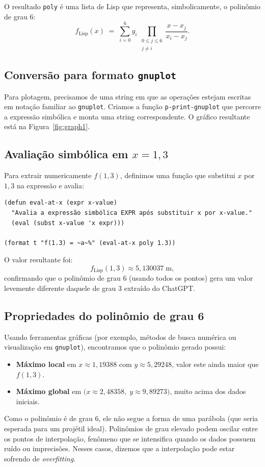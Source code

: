 \documentclass{article}
\begin{document}
O resultado \texttt{poly} é uma lista de Lisp que representa, simbolicamente, o polinômio de grau 6:
\[
f_{\mathrm{Lisp}}(x) \;=\; \sum_{i=0}^{6} y_i \,\prod_{\substack{0 \leq j \leq 6 \\ j \neq i}} \frac{x - x_j}{x_i - x_j}.
\]

\subsection{Conversão para formato \texttt{gnuplot}}
Para plotagem, precisamos de uma string em que as operações estejam escritas em notação familiar ao \texttt{gnuplot}. Criamos a função \texttt{p-print-gnuplot} que percorre a expressão simbólica e monta uma string correspondente. O gráfico resultante está na Figura~\ref{fig:graph1}.

\subsection{Avaliação simbólica em $x = 1{,}3$}
Para extrair numericamente $f(1{,}3)$, definimos uma função que substitui $x$ por $1{,}3$ na expressão e avalia:
\begin{verbatim}
(defun eval-at-x (expr x-value)
  "Avalia a expressão simbólica EXPR após substituir x por x-value."
  (eval (subst x-value 'x expr)))

(format t "f(1.3) = ~a~%" (eval-at-x poly 1.3))
\end{verbatim}

O valor resultante foi:
\[
f_{\mathrm{Lisp}}(1{,}3) \approx 5{,}130037\;\text{m},
\]
confirmando que o polinômio de grau 6 (usando todos os pontos) gera um valor levemente diferente daquele de grau 3 extraído do ChatGPT.

\subsection{Propriedades do polinômio de grau 6}
Usando ferramentas gráficas (por exemplo, métodos de busca numérica ou visualização em \texttt{gnuplot}), encontramos que o polinômio gerado possui:
\begin{itemize}
    \item \textbf{Máximo local} em $x \approx 1{,}19388$ com $y \approx 5{,}29248$, valor este ainda maior que $f(1{,}3)$.
    \item \textbf{Máximo global} em $\bigl(x \approx 2{,}48358,\;y \approx 9{,}89273\bigr)$, muito acima dos dados iniciais. 
\end{itemize}
Como o polinômio é de grau 6, ele não segue a forma de uma parábola (que seria esperada para um projétil ideal). Polinômios de grau elevado podem oscilar entre os pontos de interpolação, fenômeno que se intensifica quando os dados possuem ruído ou imprecisões. Nesses casos, dizemos que a interpolação pode estar sofrendo de \emph{overfitting}.
\end{document}
